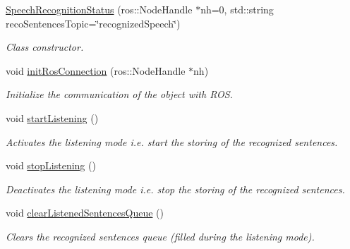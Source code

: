 \begin{DoxyCompactItemize}
\item 
\hyperlink{class_speech_recognition_status_ad7969753c6f4a13db64ffe203b7aa46b}{Speech\+Recognition\+Status} (ros\+::\+Node\+Handle $\ast$nh=0, std\+::string reco\+Sentences\+Topic=\char`\"{}recognized\+Speech\char`\"{})
\begin{DoxyCompactList}\small\item\em Class constructor. \end{DoxyCompactList}\item 
void \hyperlink{class_speech_recognition_status_af1cf52b9e55682347779ff61101827d9}{init\+Ros\+Connection} (ros\+::\+Node\+Handle $\ast$nh)
\begin{DoxyCompactList}\small\item\em Initialize the communication of the object with R\+OS. \end{DoxyCompactList}\item 
void \hyperlink{class_speech_recognition_status_a87b7f32cce3498ccaf34792d4557f23f}{start\+Listening} ()\hypertarget{class_speech_recognition_status_a87b7f32cce3498ccaf34792d4557f23f}{}\label{class_speech_recognition_status_a87b7f32cce3498ccaf34792d4557f23f}

\begin{DoxyCompactList}\small\item\em Activates the listening mode i.\+e. start the storing of the recognized sentences. \end{DoxyCompactList}\item 
void \hyperlink{class_speech_recognition_status_acdd801807e5fac5a6e68b1aed8c7ca22}{stop\+Listening} ()\hypertarget{class_speech_recognition_status_acdd801807e5fac5a6e68b1aed8c7ca22}{}\label{class_speech_recognition_status_acdd801807e5fac5a6e68b1aed8c7ca22}

\begin{DoxyCompactList}\small\item\em Deactivates the listening mode i.\+e. stop the storing of the recognized sentences. \end{DoxyCompactList}\item 
void \hyperlink{class_speech_recognition_status_a6cb03e02b0b474d9361a4b546c2c103a}{clear\+Listened\+Sentences\+Queue} ()
\begin{DoxyCompactList}\small\item\em Clears the recognized sentences queue (filled during the listening mode). \end{DoxyCompactList}\end{DoxyCompactItemize}


